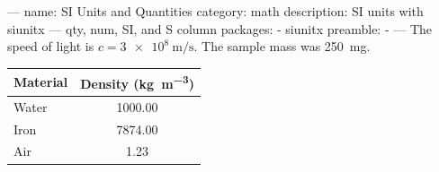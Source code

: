 ---
name: SI Units and Quantities
category: math
description: SI units with siunitx — qty, num, SI, and S column
packages:
  - siunitx
preamble:
  - 
---
The speed of light is $c = \qty{3e8}{\metre\per\second}$.
The sample mass was \qty{250}{\milli\gram}.

\begin{tabular}{l S[table-format=3.2]}
  \toprule
  Material & {Density (\unit{\kilogram\per\metre\cubed})} \\
  \midrule
  Water    & 1000.00 \\
  Iron     & 7874.00 \\
  Air      & 1.23 \\
  \bottomrule
\end{tabular}
